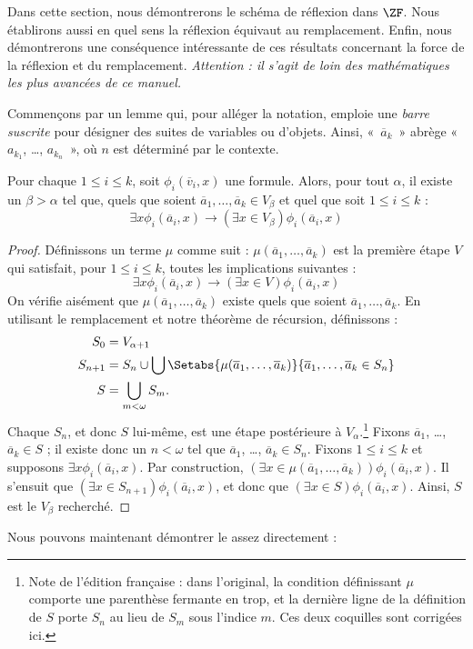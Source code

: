 \documentclass[../../../include/open-logic-section]{subfiles}
\begin{document}

Dans cette section, nous démontrerons le schéma de réflexion
dans $\ZF$. Nous établirons aussi en quel sens la réflexion
équivaut au remplacement. Enfin, nous démontrerons une conséquence
intéressante de ces résultats concernant la force de la
réflexion et du remplacement. \emph{Attention : il s'agit
de loin des mathématiques les plus avancées de ce manuel.}

Commençons par un lemme qui, pour alléger la notation, emploie
une \emph{barre suscrite} pour désigner des suites de variables
ou d'objets. Ainsi, «~$\overline{a}_k$~» abrège
«~$a_{k_1}$, \dots, $a_{k_n}$~», où $n$ est déterminé
par le contexte.

\begin{lem}
Pour chaque $1 \leq i \leq k$, soit
$\phi_i(\overline{v}_i, x)$ une formule. Alors, pour tout
$\alpha$, il existe un $\beta > \alpha$ tel que,
quels que soient $\overline{a}_1, \ldots,
\overline{a}_k \in V_\beta$ et quel que soit
$1 \leq i \leq k$ :
\[
	\exists x\phi_i(\overline{a}_i, x) \rightarrow
	(\exists x \in V_\beta) \phi_i(\overline{a}_i, x)
\]
\end{lem}

\begin{proof}
Définissons un terme $\mu$ comme suit :
$\mu(\overline{a}_1, \ldots, \overline{a}_k)$
est la première étape $V$ qui satisfait, pour
$1 \leq i \leq k$, toutes les implications suivantes :
\[
\exists x\phi_i(\overline{a}_i, x) \rightarrow
(\exists x \in V) \phi_i(\overline{a}_i, x)
\]
On vérifie aisément que
$\mu(\overline{a}_1, \ldots, \overline{a}_k)$
existe quels que soient $\overline{a}_1, \ldots,
\overline{a}_k$. En utilisant le remplacement et notre
théorème de récursion, définissons :
\begin{align*}
	S_0 & = V_{\alpha+1}\\
	S_{n+1} & = S_n \cup \bigcup
	\Setabs{\mu(\overline{a}_1, \ldots, \overline{a}_k)}
	{\overline{a}_1, \ldots, \overline{a}_k \in S_n} \\
	S &= \bigcup_{m < \omega} S_m.
\end{align*}
Chaque $S_n$, et donc $S$ lui-même, est une étape
postérieure à $V_\alpha$.\footnote{Note de l'édition française :
dans l'original, la condition définissant $\mu$ comporte
une parenthèse fermante en trop, et la dernière ligne de la
définition de $S$ porte $S_n$ au lieu de $S_m$ sous l'indice
$m$. Ces deux coquilles sont corrigées ici.}
Fixons $\overline{a}_1$, \dots,~
$\overline{a}_k \in S$ ; il existe donc un
$n < \omega$ tel que $\overline{a}_1$, \dots,
$\overline{a}_k \in S_n$. Fixons $1 \leq i \leq k$
et supposons $\exists x\phi_i(\overline{a}_i,x)$.
Par construction,
$(\exists x \in \mu(\overline{a}_1,
\ldots, \overline{a}_k))\phi_i(\overline{a}_i, x)$.
Il s'ensuit que
$(\exists x \in S_{n+1})\phi_i(\overline{a}_i, x)$,
et donc que $(\exists x \in S)\phi_i(\overline{a}_i, x)$.
Ainsi, $S$ est le $V_\beta$ recherché.
\end{proof}
\noindent
Nous pouvons maintenant démontrer le
assez directement :
\end{document}
